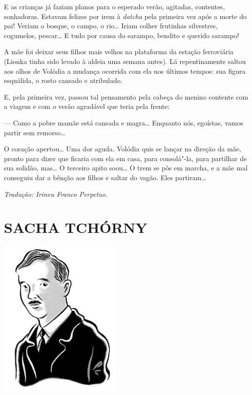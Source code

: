E as crianças já faziam planos para o esperado verão, agitadas,
contentes, sonhadoras. Estavam felizes por irem à \emph{datcha} pela
primeira vez após a morte do pai! Veriam o bosque, o campo, o rio\ldots{}
Iriam colher frutinhas silvestres, cogumelos, pescar\ldots{} E tudo por causa
do sarampo, bendito e querido sarampo!

A mãe foi deixar seus filhos mais velhos na plataforma da estação
ferroviária (Lionka tinha sido levado à aldeia uma semana antes). Lá
repentinamente saltou aos olhos de Volódia a mudança ocorrida com ela
nos últimos tempos: sua figura esquálida, o rosto cansado e atribulado.

E, pela primeira vez, passou tal pensamento pela cabeça do menino
contente com a viagem e com o verão agradável que teria pela frente:

--- Como a pobre mamãe está cansada e magra\ldots{} Enquanto nós, egoístas,
vamos partir sem remorso\ldots{}

O coração apertou\ldots{} Uma dor aguda. Volódia quis se lançar na direção da
mãe, pronto para dizer que ficaria com ela em casa, para consolá"-la,
para partilhar de sua solidão, mas\ldots{} O terceiro apito soou\ldots{} O trem se
pôs em marcha, e a mãe mal conseguiu dar a bênção aos filhos e saltar do
vagão. Eles partiram\ldots{}

\medskip

{\footnotesize\hfill\emph{Tradução: Irineu Franco Perpetuo.}}


\part[SACHA TCHÓRNY]{SACHA TCHÓRNY }

\pagebreak
\thispagestyle{empty}
\mbox{}
\vfill
\begin{center}
\includegraphics[width=6cm]{./imgs/autor11.jpg}
\end{center}


